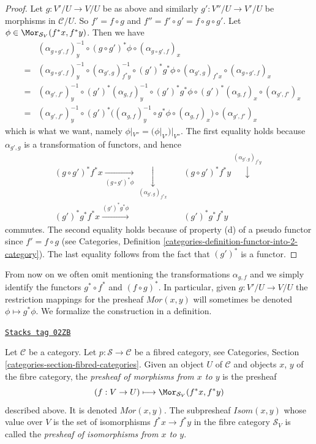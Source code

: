 \begin{proof}
Let $g : V'/U \to V/U$ be as above and similarly
$g' : V''/U \to V'/U$ be morphisms in $\mathcal{C}/U$.
So $f' = f \circ g$ and $f'' = f' \circ g' = f \circ g \circ g'$.
Let $\phi \in \Mor_{\mathcal{S}_V}(f^\ast x, f^\ast y)$.
Then we have
\begin{eqnarray*}
& &
(\alpha_{g \circ g', f})_y^{-1} \circ
(g \circ g')^\ast \phi \circ
(\alpha_{g \circ g', f})_x
\\
& = &
(\alpha_{g \circ g', f})_y^{-1} \circ
(\alpha_{g', g})_{f^*y}^{-1} \circ
(g')^*g^\ast \phi \circ
(\alpha_{g', g})_{f^*x} \circ
(\alpha_{g \circ g', f})_x
\\
& = &
(\alpha_{g', f'})_y^{-1} \circ
(g')^*(\alpha_{g, f})_y^{-1} \circ
(g')^* g^\ast \phi \circ
(g')^*(\alpha_{g, f})_x
\circ
(\alpha_{g', f'})_x
\\
& = &
(\alpha_{g', f'})_y^{-1} \circ
(g')^*\Big(
(\alpha_{g, f})_y^{-1} \circ
g^\ast \phi \circ
(\alpha_{g, f})_x
\Big) \circ
(\alpha_{g', f'})_x
\end{eqnarray*}
which is what we want, namely $\phi|_{V''} = (\phi|_{V'})|_{V''}$.
The first equality holds because
$\alpha_{g', g}$ is a transformation of functors, and hence
$$
\begin{array}{ccc}(g \circ g')^*f^*x
\underset{(g \circ g')^\ast \phi}{\longrightarrow}\underset{(\alpha_{g', g})_{f^*x}}{\downarrow} &  & (g \circ g')^*f^*y
\overset{(\alpha_{g', g})_{f^*y}}{\downarrow} \\ (g')^*g^*f^*x
\overset{(g')^*g^\ast \phi}{\longrightarrow} &  & (g')^*g^*f^*y\end{array}
$$
commutes. The second equality holds because of property (d) of
a pseudo functor since $f' = f \circ g$ (see
Categories, Definition \ref{categories-definition-functor-into-2-category}).
The last equality follows from the fact that $(g')^*$ is a functor.
\end{proof}

From now on we often omit mentioning the transformations
$\alpha_{g, f}$ and we simply identify the functors
$g^* \circ f^*$ and $(f \circ g)^*$. In particular,
given $g : V'/U \to V/U$ the restriction
mappings for the presheaf $\mathit{Mor}(x, y)$
will sometimes be denoted $\phi \mapsto g^*\phi$.
We formalize the construction in a definition.

\begin{definition}
\label{stacks-definition-mor-presheaf}
\href{https://stacks.math.columbia.edu/tag/02ZB}{\texttt{Stacks tag 02ZB}}

Let $\mathcal{C}$ be a category.
Let $p : \mathcal{S} \to \mathcal{C}$ be a fibred category,
see Categories, Section \ref{categories-section-fibred-categories}.
Given an object $U$ of $\mathcal{C}$ and objects
$x$, $y$ of the fibre category, the {\it presheaf
of morphisms from $x$ to $y$} is the presheaf
$$
(f : V \to U) \longmapsto \Mor_{\mathcal{S}_V}(f^*x, f^*y)
$$
described above. It is denoted $\mathit{Mor}(x, y)$.
The subpresheaf $\mathit{Isom}(x, y)$ whose value
over $V$ is the set of isomorphisms
$f^*x \to f^*y$ in the fibre category $\mathcal{S}_V$
is called the {\it presheaf of isomorphisms from $x$ to $y$}.
\end{definition}

